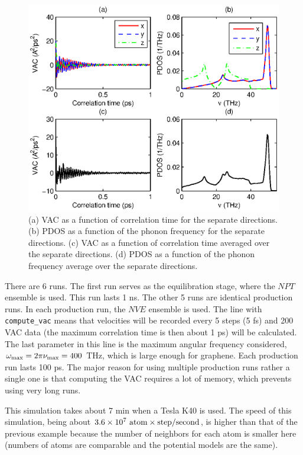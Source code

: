 \documentclass[12pt,a4paper]{report}
\begin{document}
\begin{figure}[ht]
\begin{center}
\includegraphics[width=\columnwidth]{ex2.eps}
\caption{(a) VAC as a function of correlation time for the separate directions.
(b) PDOS as a function of the phonon frequency for the separate directions.
(c) VAC as a function of correlation time averaged over the separate directions.
(d) PDOS as a function of the phonon frequency average over the separate directions.}
\label{figure:graphene_vac_dos}
\end{center}
\end{figure}

There are 6 runs. The first run serves as the equilibration stage, where the $NPT$ ensemble is used. This run lasts 1 ns. The other 5 runs are identical production runs. In each production run, the $NVE$ ensemble is used. The line with \verb"compute_vac" means that velocities will be recorded every 5 steps (5 fs) and 200 VAC data (the maximum correlation time is then about 1 ps) will be calculated. The last parameter in this line is the maximum angular frequency considered, $\omega_{\rm max} = 2\pi\nu_{\rm max} =400$ THz, which is large enough for graphene. Each production run lasts 100 ps. The major reason for using multiple production runs rather a single one is that computing the VAC requires a lot of memory, which prevents using very long runs.

This simulation takes about 7 min when a Tesla K40 is used.
The speed of this simulation, being about $3.6\times 10^7 ~\textmd{atom} \times \textmd{step} / \textmd{second}$, is higher than that of the previous example because the number of neighbors for each atom is smaller here (numbers of atoms are comparable and the potential models are the same).
\end{document}
